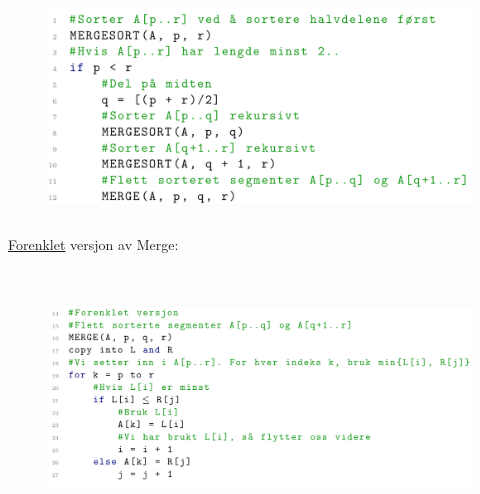 \documentclass[12pt]{report}
\begin{document}

\begin{figure}[H]
	\begin{Center}
		\includegraphics[width=5.02in,height=2.31in]{./media/image166.png}
	\end{Center}
\end{figure}



\par


\vspace{\baselineskip}
{\fontsize{13pt}{15.6pt}\selectfont \uline{Forenklet} versjon av Merge: \par}\par


\vspace{\baselineskip}



\begin{figure}[H]
	\begin{Center}
		\includegraphics[width=6.3in,height=2.66in]{./media/image167.png}
	\end{Center}
\end{figure}
\end{document}
